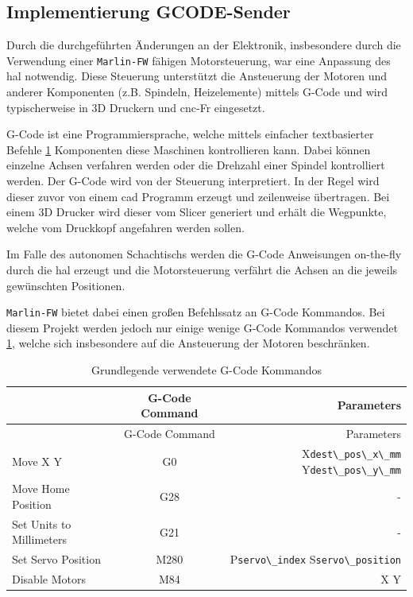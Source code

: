 \hypertarget{implementierung-gcode-sender}{%
\subsection{Implementierung
GCODE-Sender}\label{implementierung-gcode-sender}}

Durch die durchgeführten Änderungen an der Elektronik, insbesondere
durch die Verwendung einer
\passthrough{\lstinline!Marlin-FW!}\cite{marlinfw} fähigen
Motorsteuerung, war eine Anpassung des \gls{hal} notwendig. Diese
Steuerung unterstützt die Ansteuerung der Motoren und anderer
Komponenten (z.B. Spindeln, Heizelemente) mittels G-Code und wird
typischerweise in 3D Druckern und \gls{cnc}-Fr eingesetzt.

G-Code ist eine Programmiersprache, welche mittels einfacher
textbasierter Befehle \ref{gcodecmd} Komponenten diese Maschinen
kontrollieren kann. Dabei können einzelne Achsen verfahren werden oder
die Drehzahl einer Spindel kontrolliert werden. Der G-Code wird von der
Steuerung interpretiert. In der Regel wird dieser zuvor von einem
\gls{cad} Programm erzeugt und zeilenweise übertragen. Bei einem 3D
Drucker wird dieser vom Slicer generiert und erhält die Wegpunkte,
welche vom Druckkopf angefahren werden sollen.

Im Falle des autonomen Schachtischs werden die G-Code Anweisungen
on-the-fly durch die \gls{hal} erzeugt und die Motorsteuerung verfährt
die Achsen an die jeweils gewünschten Positionen.

\passthrough{\lstinline!Marlin-FW!} bietet dabei einen großen
Befehlssatz an G-Code Kommandos. Bei diesem Projekt werden jedoch nur
einige wenige G-Code Kommandos verwendet \ref{gcodecmd}, welche sich
insbesondere auf die Ansteuerung der Motoren beschränken.

\begin{longtable}[]{@{}lcr@{}}
\caption{Grundlegende verwendete G-Code Kommandos
\label{gcodecmd}}\tabularnewline
\toprule
& G-Code Command & Parameters\tabularnewline
\midrule
\endfirsthead
\toprule
& G-Code Command & Parameters\tabularnewline
\midrule
\endhead
Move X Y & G0 & X\passthrough{\lstinline!dest\_pos\_x\_mm!}
Y\passthrough{\lstinline!dest\_pos\_y\_mm!}\tabularnewline
Move Home Position & G28 & -\tabularnewline
Set Units to Millimeters & G21 & -\tabularnewline
Set Servo Position & M280 & P\passthrough{\lstinline!servo\_index!}
S\passthrough{\lstinline!servo\_position!}\tabularnewline
Disable Motors & M84 & X Y\tabularnewline
\bottomrule
\end{longtable}

